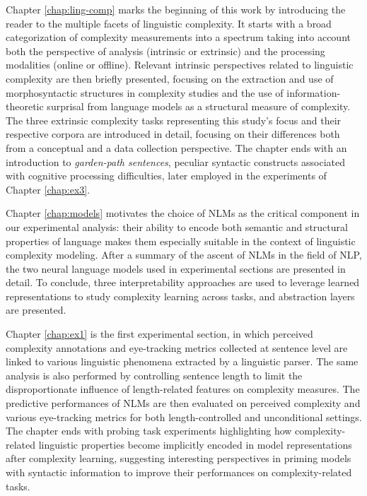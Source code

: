 \documentclass[a4paper, nobind]{templates/ociamthesis}
\begin{document}
Chapter \ref{chap:ling-comp} marks the beginning of this work by introducing the reader to the multiple facets of linguistic complexity. It starts with a broad categorization of complexity measurements into a spectrum taking into account both the perspective of analysis (intrinsic or extrinsic) and the processing modalities (online or offline). Relevant intrinsic perspectives related to linguistic complexity are then briefly presented, focusing on the extraction and use of morphosyntactic structures in complexity studies and the use of information-theoretic surprisal from language models as a structural measure of complexity. The three extrinsic complexity tasks representing this study's focus and their respective corpora are introduced in detail, focusing on their differences both from a conceptual and a data collection perspective. The chapter ends with an introduction to \emph{garden-path sentences}, peculiar syntactic constructs associated with cognitive processing difficulties, later employed in the experiments of Chapter \ref{chap:ex3}.

Chapter \ref{chap:models} motivates the choice of NLMs as the critical component in our experimental analysis: their ability to encode both semantic and structural properties of language makes them especially suitable in the context of linguistic complexity modeling. After a summary of the ascent of NLMs in the field of NLP, the two neural language models used in experimental sections are presented in detail. To conclude, three interpretability approaches are used to leverage learned representations to study complexity learning across tasks, and abstraction layers are presented.

Chapter \ref{chap:ex1} is the first experimental section, in which perceived complexity annotations and eye-tracking metrics collected at sentence level are linked to various linguistic phenomena extracted by a linguistic parser. The same analysis is also performed by controlling sentence length to limit the disproportionate influence of length-related features on complexity measures. The predictive performances of NLMs are then evaluated on perceived complexity and various eye-tracking metrics for both length-controlled and unconditional settings. The chapter ends with probing task experiments highlighting how complexity-related linguistic properties become implicitly encoded in model representations after complexity learning, suggesting interesting perspectives in priming models with syntactic information to improve their performances on complexity-related tasks.
\end{document}
